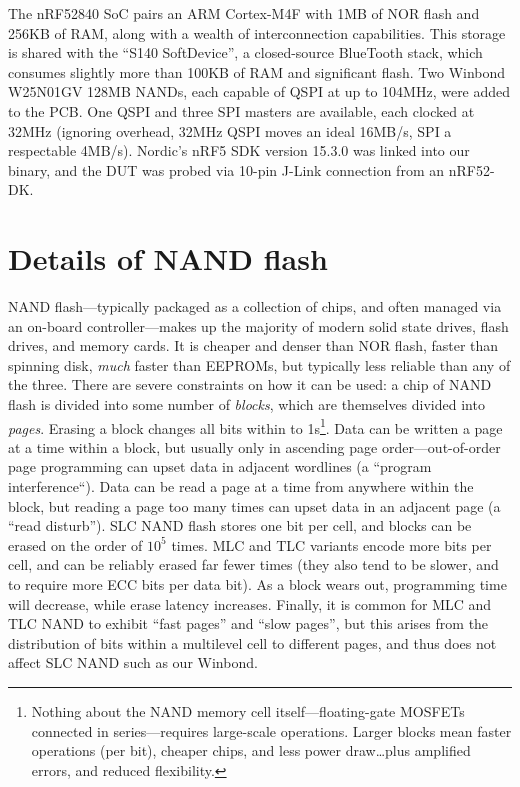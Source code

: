 \documentclass[letterpaper,10pt]{article}
\begin{document}
The nRF52840\parencite{nrf52840} SoC pairs an ARM Cortex-M4F with 1MB of
NOR flash and 256KB of RAM, along with a wealth of interconnection
capabilities. This storage is shared with the ``S140
SoftDevice''\parencite{s140}, a closed-source BlueTooth stack, which consumes
slightly more than 100KB of RAM and significant flash.
Two Winbond W25N01GV\parencite{winbond}
128MB NANDs, each capable of QSPI at up to 104MHz, were added to the PCB.
One QSPI and three SPI masters are available, each clocked at 32MHz (ignoring
overhead, 32MHz QSPI moves an ideal 16MB/s, SPI a respectable 4MB/s). Nordic's nRF5 SDK\parencite{nrf52sdk}
version 15.3.0 was linked into our binary, and the DUT was probed via 10-pin
J-Link\parencite{segger} connection from an nRF52-DK\parencite{nrf52dk}.

\section{Details of NAND flash}

NAND flash---typically packaged as a collection of chips, and often managed via
an on-board controller---makes up the majority of modern solid state drives,
flash drives, and memory cards. It is cheaper and denser than NOR flash,
faster than spinning disk, \textit{much} faster than EEPROMs, but typically
less reliable than any of the three. There are severe constraints on how it can be
used: a chip of NAND flash is divided into some number of \textit{blocks}, which are
themselves divided into \textit{pages}. Erasing a block changes all bits within to
1s\footnote{Nothing about the NAND memory cell itself---floating-gate MOSFETs
connected in series---requires large-scale operations. Larger blocks mean
faster operations (per bit), cheaper chips, and less power draw\ldots plus
amplified errors, and reduced flexibility.}. Data can be written a page at a
time within a block, but usually only in ascending page order---out-of-order
page programming can upset data in adjacent wordlines (a ``program
interference``\parencite{interference}). Data can be read a page at a time from
anywhere within the block, but reading a page too many times can upset data in
an adjacent page (a ``read disturb''\parencite{readdisturb}). SLC NAND flash stores one bit per cell,
and blocks can be erased on the order of $10^5$ times. MLC and TLC variants
encode more bits per cell, and can be reliably erased far fewer times (they
also tend to be slower, and to require more ECC bits per data bit). As a block
wears out, programming time will decrease, while erase latency
increases\parencite{needtoknow}. Finally, it is common for MLC and TLC NAND to
exhibit ``fast pages'' and ``slow pages'', but this arises from the
distribution of bits within a multilevel cell to different pages, and thus does
not affect SLC NAND\parencite{anomalies} such as our Winbond.
\end{document}
